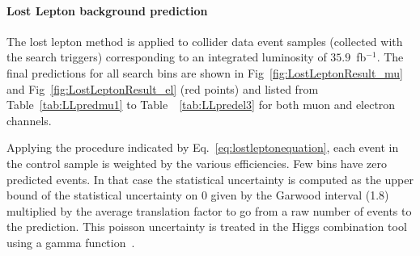 \paragraph{Lost Lepton background prediction}

The lost lepton method is applied to collider data event samples (collected with the search triggers) corresponding to an integrated luminosity of $35.9$~fb$^{-1}$. The final predictions for all search bins are shown in Fig~\ref{fig:LostLeptonResult_mu} and Fig~\ref{fig:LostLeptonResult_el} (red points) and listed from Table~\ref{tab:LLpredmu1} to Table~~\ref{tab:LLpredel3} for both muon and electron channels.

Applying the procedure indicated by Eq.~\ref{eq:lostleptonequation}, each event in the control sample is weighted by the various efficiencies. 
Few bins have zero predicted events. In that case the statistical uncertainty is computed as the upper bound of the statistical uncertainty on 0 given by the Garwood interval (1.8) multiplied by the average translation factor to go from a raw number of events to the prediction. This poisson uncertainty is treated in the Higgs combination tool using a gamma function~\cite{HiggsCombine,cms-note-2011-005}.

